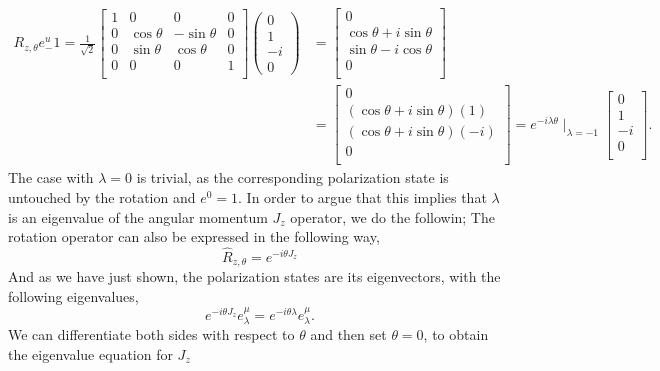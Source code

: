 \documentclass[working, oneside]{../../../Preambles/tuftebook}
\begin{document}
\begin{align*}
    R_{z, \theta }e^{u}_-1 = \frac{1}{\sqrt{2} }
\begin{bmatrix}
    1 & 0 & 0 & 0  \\
    0 &   \cos\theta & -\sin \theta & 0 \\
    0 &\sin \theta  & \cos \theta  &0  \\
    0 &   0 & 0 &1  \\
\end{bmatrix}
\left(\begin{matrix}0\\1\\-i\\0\end{matrix}\right)
&= 
\begin{bmatrix}
    0 \\
    \cos\theta + i\sin \theta  \\
    \sin \theta -i\cos\theta  \\
    0 \\
\end{bmatrix}\\
&=
\begin{bmatrix}
    0 \\
    \left(   \cos\theta + i\sin \theta \right)\left( 1 \right)  \\
    \left( \cos \theta + i\sin \theta  \right) \left( -i \right)  \\
    0  \\
\end{bmatrix}
    = e^{-i\lambda\theta }\mid_{\lambda = -1}
\begin{bmatrix}
    0 \\
    1 \\
    -i \\
    0 \\
\end{bmatrix}
.\end{align*}
The case with $\lambda = 0$ is trivial, as the corresponding polarization state is untouched by the rotation and $e^{0}=1$. In order to argue that this implies that $\lambda$ is an eigenvalue of the angular momentum $J_z$ operator, we do the followin; The rotation operator can also be expressed in the following way,
\[
\hat{R}_{z,\theta } = e^{-i\theta J_{z}}
\] 
And as we have just shown, the polarization states are its eigenvectors, with the following eigenvalues,
\[
e^{-i\theta J_z}e^{\mu }_{\lambda} = e^{-i\theta \lambda}e^{\mu }_{\lambda}
.\] 
We can differentiate both sides with respect to $\theta $ and then set $\theta = 0$, to obtain the eigenvalue equation for $J_z$ 
\end{document}
